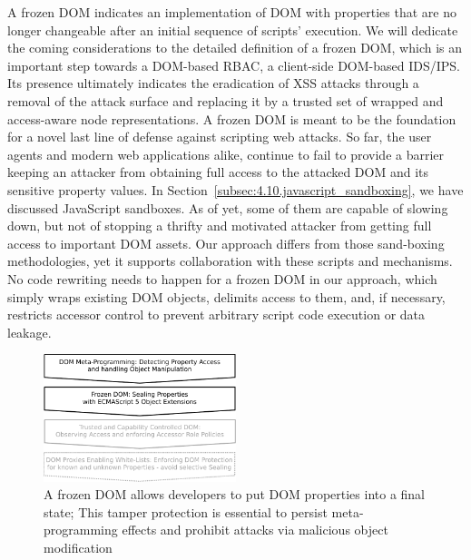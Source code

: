       A frozen DOM indicates an implementation of DOM with properties that are no longer changeable after an initial sequence of scripts' execution. We will dedicate the coming considerations to the detailed definition of a frozen DOM, which is an important step towards a DOM-based RBAC, a client-side DOM-based IDS/IPS. Its presence ultimately indicates the eradication of XSS attacks through a removal of the attack surface and replacing it by a trusted set of wrapped and access-aware node representations. A frozen DOM is meant to be the foundation for a novel last line of defense against scripting web attacks. So far, the user agents and modern web applications alike, continue to fail to provide a barrier keeping an attacker from obtaining full access to the attacked DOM and its sensitive property values. In Section~\ref{subsec:4.10.javascript_sandboxing}, we have discussed JavaScript sandboxes. As of yet, some of them are capable of slowing down, but  not of stopping a thrifty and motivated attacker from getting full access to important DOM assets. Our approach differs from those sand-boxing methodologies, yet it supports collaboration with these scripts and mechanisms. No code rewriting needs to happen for a frozen DOM in our approach, which simply wraps existing DOM objects, delimits access to them, and, if necessary, restricts accessor control to prevent arbitrary script code execution or data leakage. \\

\begin{figure}[htb]
\centering
\includegraphics[width=0.5\textwidth]{./img/dom-protect-2.pdf}
\caption{A frozen DOM allows developers to put DOM properties into a final state; This tamper protection is essential to persist meta-programming effects and prohibit attacks via malicious object modification}
\label{fig:dom-protect-2}
\end{figure}
    

